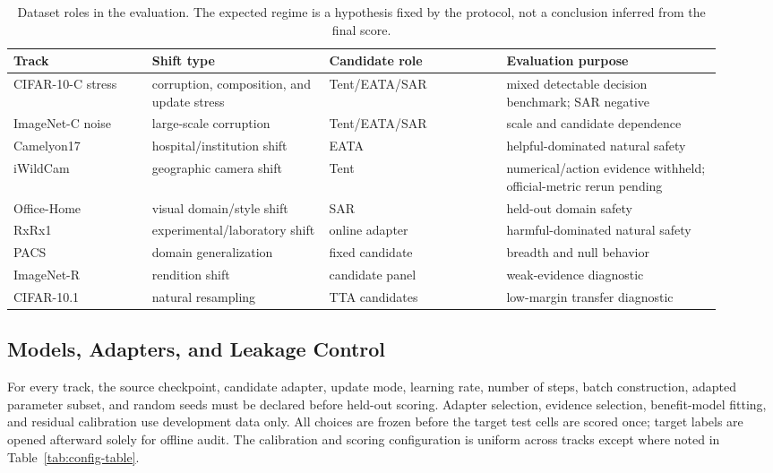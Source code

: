 \begin{table}[t]\centering\scriptsize
\caption{Dataset roles in the evaluation. The expected regime is a hypothesis fixed by the protocol, not a conclusion inferred from the final score.}
\label{tab:dataset-taxonomy}
\begin{tabular}{@{}p{0.18\linewidth}p{0.23\linewidth}p{0.23\linewidth}p{0.28\linewidth}@{}}
\toprule
Track & Shift type & Candidate role & Evaluation purpose \\
\midrule
CIFAR-10-C stress & corruption, composition, and update stress & Tent/EATA/SAR & mixed detectable decision benchmark; SAR negative \\
ImageNet-C noise & large-scale corruption & Tent/EATA/SAR & scale and candidate dependence \\
Camelyon17 & hospital/institution shift & EATA & helpful-dominated natural safety \\
iWildCam & geographic camera shift & Tent & numerical/action evidence withheld; official-metric rerun pending \\
Office-Home & visual domain/style shift & SAR & held-out domain safety \\
RxRx1 & experimental/laboratory shift & online adapter & harmful-dominated natural safety \\
PACS & domain generalization & fixed candidate & breadth and null behavior \\
ImageNet-R & rendition shift & candidate panel & weak-evidence diagnostic \\
CIFAR-10.1 & natural resampling & TTA candidates & low-margin transfer diagnostic \\
\bottomrule
\end{tabular}
\end{table}

\subsection{Models, Adapters, and Leakage Control}
For every track, the source checkpoint, candidate adapter, update mode, learning rate, number of steps, batch construction, adapted parameter subset, and random seeds must be declared before held-out scoring. Adapter selection, evidence selection, benefit-model fitting, and residual calibration use development data only. All choices are frozen before the target test cells are scored once; target labels are opened afterward solely for offline audit. The calibration and scoring configuration is uniform across tracks except where noted in Table~\ref{tab:config-table}.

